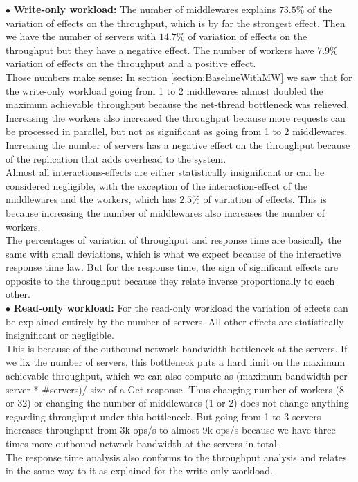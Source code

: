 $\bullet$ \textbf{Write-only workload:} The number of middlewares explains $73.5\%$ of the variation of effects on the throughput, which is by far the strongest effect. Then we have the number of servers with $14.7\%$ of variation of effects on the throughput but they have a negative effect. The number of workers have $7.9\%$ variation of effects on the throughput and a positive effect. \\
Those numbers make sense: In section \ref{section:BaselineWithMW} we saw that for the write-only workload going from 1 to 2 middlewares almost doubled the maximum achievable throughput because the net-thread bottleneck was relieved. Increasing the workers also increased the throughput because more requests can be processed in parallel, but not as significant as going from 1 to 2 middlewares. Increasing the number of servers has a negative effect on the throughput because of the replication that adds overhead to the system. \\
Almost all interactions-effects are either statistically insignificant or can be considered negligible, with the exception of the interaction-effect of the middlewares and the workers, which has $2.5\%$ of variation of effects. This is because increasing the number of middlewares also increases the number of workers. \\
The percentages of variation of throughput and response time are basically the same with small deviations, which is what we expect because of the interactive response time law. But for the response time, the sign of significant effects are opposite to the throughput because they relate inverse proportionally to each other. \\

$\bullet$ \textbf{Read-only workload:} For the read-only workload the variation of effects can be explained entirely by the number of servers. All other effects are statistically insignificant or negligible. \\
This is because of the outbound network bandwidth bottleneck at the servers. If we fix the number of servers, this bottleneck puts a hard limit on the maximum achievable throughput, which we can also compute as  (maximum bandwidth per server * \#servers)/ size of a Get response. Thus changing number of workers (8 or 32) or changing the number of middlewares (1 or 2) does not change anything regarding throughput under this bottleneck. But going from 1 to 3 servers increases throughput from 3k ops/s to almost 9k ops/s because we have three times more outbound network bandwidth at the servers in total. \\
The response time analysis also conforms to the throughput analysis and relates in the same way to it as explained for the write-only workload. 


